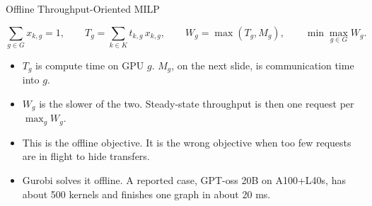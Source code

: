 \begin{frame}[t,label=mm_ts_plan_01]{Offline Throughput-Oriented MILP}

  \par
  \vspace{.08cm}
  \[
    \sum_{g\in G} x_{k,g}=1,
    \qquad
    T_g=\sum_{k\in K} t_{k,g}\,x_{k,g},
    \qquad
    W_g=\max(T_g,M_g),
    \qquad
    \min \max_{g\in G} W_g.
  \]
  \begin{itemize}\footnotesize
    \setlength{\itemsep}{.10cm}
    \item \(T_g\) is compute time on GPU \(g\). \(M_g\), on the next slide, is communication time into \(g\).
    \item \(W_g\) is the slower of the two. Steady-state throughput is then one request per \(\max_g W_g\).
    \item This is the offline objective. It is the wrong objective when too few requests are in flight to hide transfers.
    \item Gurobi solves it offline. A reported case, GPT-oss 20B on A100+L40s, has about 500 kernels and finishes one graph in about 20 ms.
  \end{itemize}
  \vspace{.10cm}
\end{frame}

